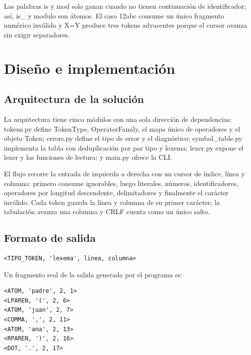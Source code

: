 \documentclass[11pt,letterpaper]{article}
\newcommand{\code}[1]{{\ttfamily\small #1}}
\begin{document}
Las palabras \code{is} y \code{mod} solo ganan cuando no tienen continuación de identificador; así, \code{is\_} y \code{modulo} son átomos. El caso \code{12abc} consume un único fragmento numérico inválido y \code{X=Y} produce tres tokens adyacentes porque el cursor avanza sin exigir separadores.

\section{Diseño e implementación}

\subsection{Arquitectura de la solución}

La arquitectura tiene cinco módulos con una sola dirección de dependencias: \code{tokens.py} define \code{TokenType}, \code{OperatorFamily}, el mapa único de operadores y el objeto \code{Token}; \code{errors.py} define el tipo de error y el diagnóstico; \code{symbol\_table.py} implementa la tabla con deduplicación por par tipo y lexema; \code{lexer.py} expone el lexer y las funciones de lectura; y \code{main.py} ofrece la CLI.

El flujo recorre la entrada de izquierda a derecha con un cursor de índice, línea y columna: primero consume ignorables, luego literales, números, identificadores, operadores por longitud descendente, delimitadores y finalmente el carácter inválido. Cada token guarda la línea y columna de su primer carácter; la tabulación avanza una columna y \code{CRLF} cuenta como un único salto.

\subsection{Formato de salida}

\begin{lstlisting}
<TIPO_TOKEN, 'lexema', linea, columna>
\end{lstlisting}

Un fragmento real de la salida generada por el programa es:

\begin{lstlisting}
<ATOM, 'padre', 2, 1>
<LPAREN, '(', 2, 6>
<ATOM, 'juan', 2, 7>
<COMMA, ',', 2, 11>
<ATOM, 'ana', 2, 13>
<RPAREN, ')', 2, 16>
<DOT, '.', 2, 17>
\end{lstlisting}
\end{document}
